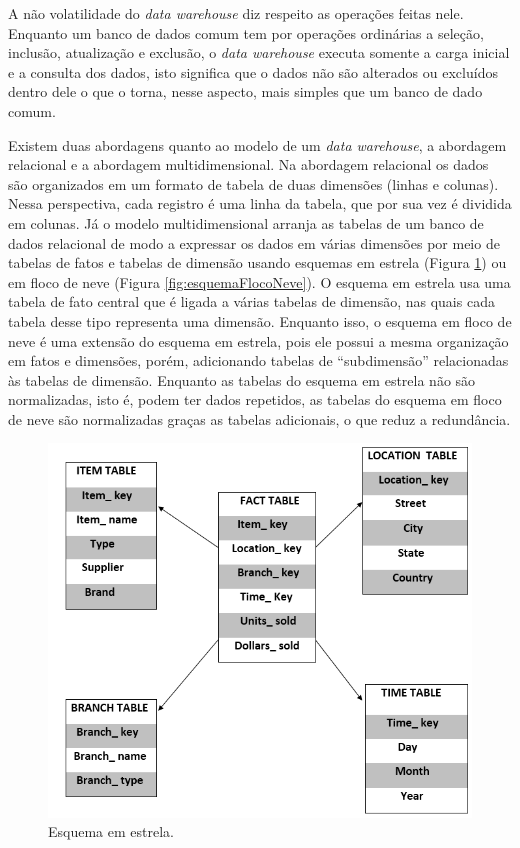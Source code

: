 A não volatilidade do \textit{data warehouse} diz respeito as operações feitas nele. Enquanto um banco de dados comum tem por operações ordinárias a seleção, inclusão, atualização e exclusão, o \textit{data warehouse} executa somente a carga inicial e a consulta dos dados, isto significa que o dados não são alterados ou excluídos dentro dele o que o torna, nesse aspecto, mais simples que um banco de dado comum.

Existem duas abordagens quanto ao modelo de um \textit{data warehouse}, a abordagem relacional e a abordagem multidimensional. Na abordagem relacional os dados são organizados em um formato de tabela de duas dimensões (linhas e colunas). Nessa perspectiva, cada registro é uma linha da tabela, que por sua vez é dividida em colunas. Já o modelo multidimensional arranja as tabelas de um banco de dados relacional de modo a expressar os dados em várias dimensões por meio de tabelas de fatos e tabelas de dimensão usando esquemas em estrela (Figura \ref{fig:esquemaEstrela}) ou em floco de neve (Figura \ref{fig:esquemaFlocoNeve}). O esquema em estrela usa uma tabela de fato central que é ligada a várias tabelas de dimensão, nas quais cada tabela desse tipo representa uma dimensão. Enquanto isso, o esquema em floco de neve é uma extensão do esquema em estrela, pois ele possui a mesma organização em fatos e dimensões, porém, adicionando tabelas de \enquote{subdimensão} relacionadas às tabelas de dimensão. Enquanto as tabelas do esquema em estrela não são normalizadas, isto é, podem ter dados repetidos, as tabelas do esquema em floco de neve são normalizadas graças as tabelas adicionais, o que reduz a redundância.

\begin{figure}[ht]
\centering
\includegraphics[width=.8\textwidth]{imagens/example-star-schema.png}
\caption{Esquema em estrela.}
\author{Fonte: https://www.educba.com/star-schema-vs-snowflake-schema/}
\label{fig:esquemaEstrela}
\end{figure}

